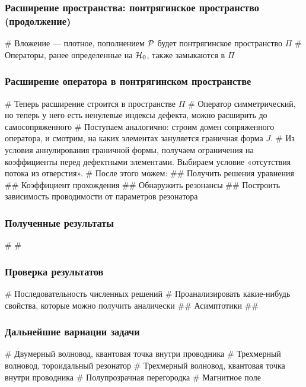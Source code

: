 \documentclass{beamer}
\begin{document}
\begin{frame}[fragile]
\frametitle{Расширение пространства: понтрягинское пространство (продолжение)}
\begin{easylist}[itemize]
# Вложение — плотное, пополнением $\mathcal{P}$ будет понтрягинское пространство $\Pi$
# Операторы, ранее определенные на $\mathcal{H}_{0}$, также замыкаются в $\Pi$
\end{easylist}
\end{frame}

\begin{frame}[fragile]
\frametitle{Расширение оператора в понтрягинском пространстве}
\begin{easylist}[itemize]
# Теперь расширение строится в пространстве $\Pi$
# Оператор симметрический, но теперь у него есть ненулевые индексы дефекта, можно расширить до самосопряженного
# Поступаем аналогично: строим домен сопряженного оператора, и смотрим, на каких элементах зануляется граничная форма $J$. 
# Из условия аннулирования граничной формы, получаем ограничения на коэффициенты перед дефектными элементами. Выбираем условие «отсутствия потока из отверстия».
# После этого можем:
## Получить решения уравнения
## Коэффициент прохождения
## Обнаружить резонансы
## Построить зависимость проводимости от параметров резонатора
\end{easylist}
\end{frame}


\begin{frame}[fragile]
\frametitle{Полученные результаты}
\begin{easylist}[itemize]
# 
# 
\end{easylist}
\end{frame}

\begin{frame}[fragile]
\frametitle{Проверка результатов}
\begin{easylist}[itemize]
# Последовательность численных решений
# Проанализировать какие-нибудь свойства, которые можно получить аналически
## Асимптотики
## 
\end{easylist}
\end{frame}

\begin{frame}[fragile]
\frametitle{Дальнейшие вариации задачи}
\begin{easylist}[itemize]
# Двумерный волновод, квантовая точка внутри проводника
# Трехмерный волновод, тороидальный резонатор 
# Трехмерный волновод, квантовая точка внутри проводника
# Полупрозрачная перегородка 
# Магнитное поле 
\end{easylist}
\end{frame}
\end{document}
